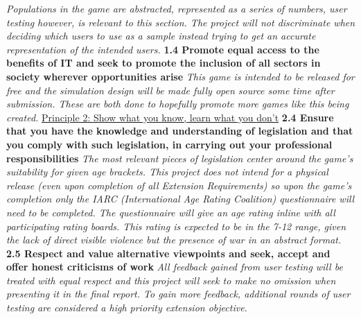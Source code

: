 \documentclass{report}
\begin{document}
\begin{raggedright}
\newline
\newline
\textit{Populations in the game are abstracted, represented as a series of numbers, user testing however, is relevant to this section. The project will not discriminate when deciding which users to use as a sample instead trying to get an accurate representation of the intended users.}
\newline
\newline
\textbf{1.4 Promote equal access to the benefits of IT and seek to promote the inclusion of all sectors in society wherever opportunities arise}
\newline
\newline
\textit{This game is intended to be released for free and the simulation design will be made fully open source some time after submission. These are both done to hopefully promote more games like this being created.}
\newline
\newline
{\Large \underline{Principle 2: Show what you know, learn what you don't}}
\newline
\newline
\textbf{2.4 Ensure that you have the knowledge and understanding of legislation and that you comply with such legislation, in carrying out your professional responsibilities}
\newline
\newline
\textit{The most relevant pieces of legislation center around the game's suitability for given age brackets. This project does not intend for a physical release (even upon completion of all Extension Requirements) so upon the game's completion only the IARC (International Age Rating Coalition) questionnaire will need to be completed. The questionnaire will give an age rating inline with all participating rating boards. This rating is expected to be in the 7-12 range, given the lack of direct visible violence but the presence of war in an abstract format.}
\newline
\newline
\textbf{2.5 Respect and value alternative viewpoints and seek, accept and offer honest criticisms of work}
\newline
\newline
\textit{All feedback gained from user testing will be treated with equal respect and this project will seek to make no omission when presenting it in the final report. To gain more feedback, additional rounds of user testing are considered a high priority extension objective.}

\end{raggedright}
\end{document}
